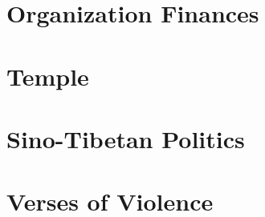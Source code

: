 

  \chapter{Organization Finances}
  
  \chapter{Temple}
  
\chapter{Sino-Tibetan Politics}\label{sinotibetanPolitics}

  \chapter{Verses of Violence}\label{violentVerses}
  



